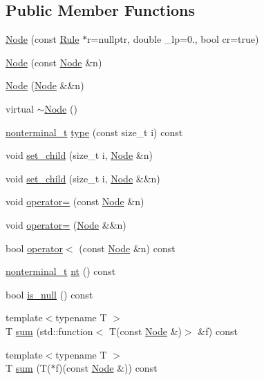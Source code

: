 \subsection*{Public Member Functions}
\begin{DoxyCompactItemize}
\item 
\hyperlink{class_node_ae33050869651f64551da2d13ad2a9dbc}{Node} (const \hyperlink{class_rule}{Rule} $\ast$r=nullptr, double \+\_\+lp=0., bool cr=true)
\item 
\hyperlink{class_node_a277918b68827f6ffd8150f450b0c12c3}{Node} (const \hyperlink{class_node}{Node} \&n)
\item 
\hyperlink{class_node_a87c9938dcd77c169802a732c98204945}{Node} (\hyperlink{class_node}{Node} \&\&n)
\item 
virtual \hyperlink{class_node_af5e3fa79300bf5f3f2f3ecae6e795a94}{$\sim$\+Node} ()
\item 
\hyperlink{_nonterminal_8h_a1c5bfe9b903f69c83bbde5da7035fef3}{nonterminal\+\_\+t} \hyperlink{class_node_aa727c354e38f60fb1560d72ae1aaa9af}{type} (const size\+\_\+t i) const
\item 
void \hyperlink{class_node_afff50c3712b8e30fffd479cad4eee023}{set\+\_\+child} (size\+\_\+t i, \hyperlink{class_node}{Node} \&n)
\item 
void \hyperlink{class_node_a486882370d2c9592c6eabb52a3289253}{set\+\_\+child} (size\+\_\+t i, \hyperlink{class_node}{Node} \&\&n)
\item 
void \hyperlink{class_node_addbfe90949f473c91203389f48095cf0}{operator=} (const \hyperlink{class_node}{Node} \&n)
\item 
void \hyperlink{class_node_abcd5c8ca2ea54716a72f7e27f9a9c937}{operator=} (\hyperlink{class_node}{Node} \&\&n)
\item 
bool \hyperlink{class_node_a8b05feb361beb04d465619751a2297b1}{operator$<$} (const \hyperlink{class_node}{Node} \&n) const
\item 
\hyperlink{_nonterminal_8h_a1c5bfe9b903f69c83bbde5da7035fef3}{nonterminal\+\_\+t} \hyperlink{class_node_a4abe3acdc804489a01ef13a25b130fd8}{nt} () const
\item 
bool \hyperlink{class_node_a895ef3b66f975fbaec1e5866a57afbed}{is\+\_\+null} () const
\item 
{\footnotesize template$<$typename T $>$ }\\T \hyperlink{class_node_ac91282056a0df2835f1579bdd21c93e1}{sum} (std\+::function$<$ T(const \hyperlink{class_node}{Node} \&)$>$ \&f) const
\item 
{\footnotesize template$<$typename T $>$ }\\T \hyperlink{class_node_a089e99addd93f91b2ef5a9d0c3e6bdeb}{sum} (T($\ast$f)(const \hyperlink{class_node}{Node} \&)) const

\end{DoxyCompactItemize}
